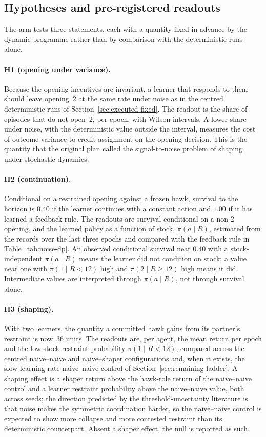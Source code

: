 \subsection{Hypotheses and pre-registered readouts}

The arm tests three statements, each with a quantity fixed in advance by
the dynamic programme rather than by comparison with the deterministic
runs alone.

\paragraph{H1 (opening under variance).}
Because the opening incentives are invariant, a learner that responds to
them should leave opening~2 at the same rate under noise as in the
centred deterministic runs of Section~\ref{sec:executed-fixed}.
The readout is the share of episodes that do not open~2, per epoch, with
Wilson intervals.
A lower share under noise, with the deterministic value outside the
interval, measures the cost of outcome variance to credit assignment on
the opening decision.
This is the quantity that the original plan called the
signal-to-noise problem of shaping under stochastic dynamics.

\paragraph{H2 (continuation).}
Conditional on a restrained opening against a frozen hawk, survival to the
horizon is \(0.40\) if the learner continues with a constant action and
\(1.00\) if it has learned a feedback rule.
The readouts are survival conditional on a non-2 opening, and the learned
policy as a function of stock, \(\pi(a \mid R)\), estimated from the
records over the last three epochs and compared with the feedback rule in
Table~\ref{tab:noise-dp}.
An observed conditional survival near \(0.40\) with a stock-independent
\(\pi(a \mid R)\) means the learner did not condition on stock; a value
near one with \(\pi(1 \mid R < 12)\) high and \(\pi(2 \mid R \ge 12)\)
high means it did.
Intermediate values are interpreted through \(\pi(a \mid R)\), not through
survival alone.

\paragraph{H3 (shaping).}
With two learners, the quantity a committed hawk gains from its partner's
restraint is now~36 units.
The readouts are, per agent, the mean return per epoch and the
low-stock restraint probability \(\pi(1 \mid R < 12)\), compared across the
centred naive--naive and naive--shaper configurations and, when it exists,
the slow-learning-rate naive--naive control of
Section~\ref{sec:remaining-ladder}.
A shaping effect is a shaper return above the hawk-role return of the
naive--naive control and a learner restraint probability above the
naive--naive value, both across seeds; the direction predicted by the
threshold-uncertainty literature \cite{barrett2012} is that noise makes
the symmetric coordination harder, so the naive--naive control is expected
to show more collapse and more contested restraint than its deterministic
counterpart.
Absent a shaper effect, the null is reported as such.

